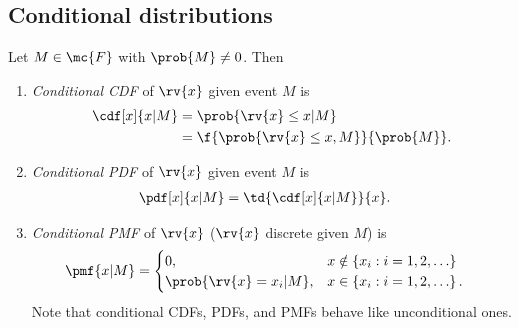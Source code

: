 \subsection{Conditional distributions}
\begin{mydefinition}      
    \label{def:SRV conitional distributions}
    Let $M\in\mc{F}$ with $\prob{M}\neq 0$. Then
    \begin{enumerate}
        \item \emph{Conditional CDF} of $\rv{x}$ given event $M$ is 
        \begin{align}
            \cdf[x]{x|M} &= \prob{\rv{x}\leq x|M}\\
            &= \f{\prob{\rv{x}\leq x,M}}{\prob{M}}.
        \end{align}
        \item \emph{Conditional PDF} of $\rv{x}$ given event $M$ is
        \begin{align}
            \pdf[x]{x|M} &= \td{\cdf[x]{x|M}}{x}.
        \end{align}
        \item \emph{Conditional PMF} of $\rv{x}$ ($\rv{x}$ discrete given $M$) is
        \begin{align}
            \pmf{x|M} 
            &=
            \begin{cases}
                0, &x \notin\left\{ x_{i} : i = 1,2,\ldots\right\}\\
                \prob{\rv{x}=x_{i}|M}, &x\in\left\{ x_{i} : i=1,2,\ldots\right\}.
            \end{cases}
        \end{align}
        Note that conditional CDFs, PDFs, and PMFs behave like unconditional ones.
    \end{enumerate}
\end{mydefinition}
